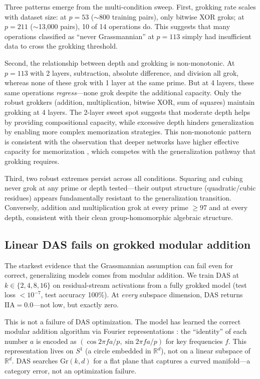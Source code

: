 \documentclass{article}
\newcommand{\Gr}{\mathrm{Gr}}
\newcommand{\IIA}{\mathrm{IIA}}
\newcommand{\R}{\mathbb{R}}
\begin{document}
Three patterns emerge from the multi-condition sweep. First, grokking rate
scales with dataset size: at $p{=}53$ ($\sim$800 training pairs), only
bitwise XOR groks; at $p{=}211$ ($\sim$13{,}000 pairs), 10 of 14 operations
do. This suggests that many operations classified as ``never Grassmannian''
at $p{=}113$ simply had insufficient data to cross the grokking threshold.

Second, the relationship between depth and grokking is non-monotonic. At
$p{=}113$ with 2 layers, subtraction, absolute difference, and division all
grok, whereas none of these grok with 1 layer at the same prime. But at 4
layers, these same operations \emph{regress}---none grok despite the
additional capacity. Only the robust grokkers (addition, multiplication,
bitwise XOR, sum of squares) maintain grokking at 4 layers. The 2-layer
sweet spot suggests that moderate depth helps by providing compositional
capacity, while excessive depth hinders generalization by enabling more
complex memorization strategies. This non-monotonic pattern is consistent
with the observation that deeper networks have higher effective capacity for
memorization \citep{arpit2017closer}, which competes with the generalization
pathway that grokking requires.

Third, two robust extremes persist across all conditions. Squaring and
cubing never grok at any prime or depth tested---their output structure
(quadratic/cubic residues) appears fundamentally resistant to the
generalization transition. Conversely, addition and multiplication grok at
every prime $\geq 97$ and at every depth, consistent with their clean
group-homomorphic algebraic structure.

\subsection{Linear DAS fails on grokked modular addition}
\label{sec:linear_das_fails}

The starkest evidence that the Grassmannian assumption can fail even for correct,
generalizing models comes from modular addition. We train DAS at
$k \in \{2, 4, 8, 16\}$ on residual-stream activations from a fully grokked
model (test loss $< 10^{-7}$, test accuracy 100\%). At \emph{every} subspace
dimension, DAS returns $\IIA = 0.0$---not low, but exactly zero.

This is not a failure of DAS optimization. The model has learned the correct
modular addition algorithm via Fourier representations \citep{nanda2023progress}:
the ``identity'' of each number $a$ is encoded as
$(\cos 2\pi f a / p, \sin 2\pi f a / p)$ for key frequencies $f$. This
representation lives on $S^1$ (a circle embedded in $\R^d$), not on a linear
subspace of $\R^d$. DAS searches $\Gr(k,d)$ for a flat plane that captures a
curved manifold---a category error, not an optimization failure.
\end{document}
